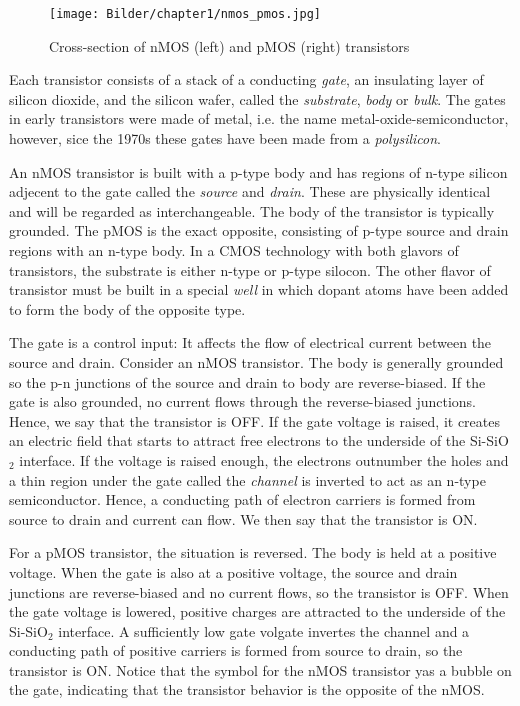 \begin{figure}[H]
    \centering
    \texttt{[image: Bilder/chapter1/nmos\_pmos.jpg]}
    \caption{Cross-section of nMOS (left) and pMOS (right) transistors}
    \label{fig:nmos_pmos}
\end{figure}

Each transistor consists of a stack of a conducting \textit{gate}, an insulating layer of silicon dioxide, and the silicon wafer, called the \textit{substrate}, 
\textit{body} or \textit{bulk}. The gates in early transistors were made of metal, i.e. the name metal-oxide-semiconductor, however, sice the 1970s these gates have been 
made from a \textit{polysilicon}.

An nMOS transistor is built with a p-type body and has regions of n-type silicon adjecent to the gate called the \textit{source} and \textit{drain}. These are physically
identical and will be regarded as interchangeable. The body of the transistor is typically grounded. The pMOS is the exact opposite, 
consisting of p-type source and drain regions with an n-type body. In a CMOS technology with both glavors of transistors, the substrate is either 
n-type or p-type silocon. The other flavor of transistor must be built in a special \textit{well} in which dopant atoms have been added to form the body of the 
opposite type.

The gate is a control input: It affects the flow of electrical current between the source and drain. Consider an nMOS transistor. The body is generally grounded so the p-n 
junctions of the source and drain to body are reverse-biased. If the gate is also grounded, no current flows through the reverse-biased junctions. Hence, we say that the
transistor is OFF. If the gate voltage is raised, it creates an electric field that starts to attract free electrons to the underside of the Si-SiO$_2$ interface. If the voltage 
is raised enough, the electrons outnumber the holes and a thin region under the gate called the \textit{channel} is inverted to act as an n-type semiconductor.
Hence, a conducting path of electron carriers is formed from source to drain and current can flow. We then say that the transistor is ON.

For a pMOS transistor, the situation is reversed. The body is held at a positive voltage. When the gate is also at a positive voltage, the source and drain
junctions are reverse-biased and no current flows, so the transistor is OFF. When the gate voltage is lowered, positive charges are attracted to the underside of the Si-SiO$_2$ 
interface. A sufficiently low gate volgate invertes the channel and a conducting path of positive carriers is formed from source to drain, so the transistor is ON. 
Notice that the symbol for the nMOS transistor yas a bubble on the gate, indicating that the transistor behavior is the opposite of the nMOS.

